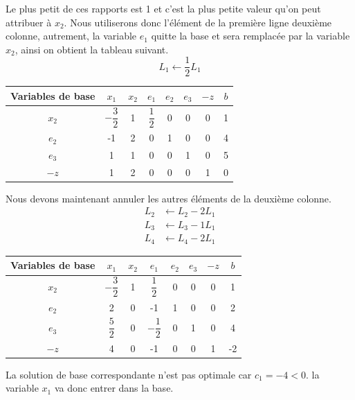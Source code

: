 \documentclass[a4paper,12pt,openany]{book}
\theoremstyle{plain}
\theoremstyle{definition}
\theoremstyle{remark}
\theoremstyle{nbstyle}
\begin{document}
	
	Le plus petit de ces rapports est 1 et c'est la plus petite valeur qu'on peut attribuer à $ x_{2} $. Nous utiliserons donc l'élément de la première ligne deuxième colonne, autrement, la variable $ e_{1} $ quitte la base et sera remplacée par la variable $ x_{2} $, ainsi on obtient la tableau suivant.
	\[
	L_{1} \leftarrow \dfrac{1}{2} L_{1}
	\]
	
	\begin{center}
		\begin{tabular}{c|ccccc|c|c}
			\toprule
			Variables de base & $x_{1}$ & $x_{2}$ & $e_{1}$ & $e_{2}$ & $e_{3}$ & $-z$ & $b$ \\
			\midrule
			$x_{2}$ & $-\dfrac{3}{2}$ & 1 & $\dfrac{1}{2}$ & 0 & 0 & 0 & 1 \\
			$e_{2}$ & -1 & 2 & 0 & 1 & 0 & 0 & 4 \\
			$e_{3}$ & 1 & 1 & 0 & 0 & 1 & 0 & 5 \\
			\hline
			$-z$ & 1 & 2 & 0 & 0 & 0 & 1 & 0 \\
			\bottomrule
		\end{tabular}
	\end{center}
	
	Nous devons maintenant annuler les autres éléments de la deuxième colonne.
	\[
	\begin{aligned}
	L_{2} &\leftarrow L_{2} - 2 L_{1} \\
	L_{3} &\leftarrow L_{3} - 1 L_{1} \\
	L_{4} &\leftarrow L_{4} - 2 L_{1}
	\end{aligned}
	\]
	
	\begin{center}
		\begin{tabular}{c|ccccc|c|c}
			\toprule
			Variables de base & $x_{1}$ & $x_{2}$ & $e_{1}$ & $e_{2}$ & $e_{3}$ & $-z$ & $b$ \\
			\midrule
			$x_{2}$ & $-\dfrac{3}{2}$ & 1 & $\dfrac{1}{2}$ & 0 & 0 & 0 & 1 \\
			$e_{2}$ & 2 & 0 & -1 & 1 & 0 & 0 & 2 \\
			$e_{3}$ & $\dfrac{5}{2}$ & 0 & $-\dfrac{1}{2}$ & 0 & 1 & 0 & 4 \\
			$-z$ & 4 & 0 & -1 & 0 & 0 & 1 & -2 \\
			\bottomrule
		\end{tabular}
	\end{center}
	La solution de base correspondante n'est pas optimale car $c_{1}=-4<0$. la variable $x_{1}$ va donc entrer dans la base.\\
	
\end{document}
